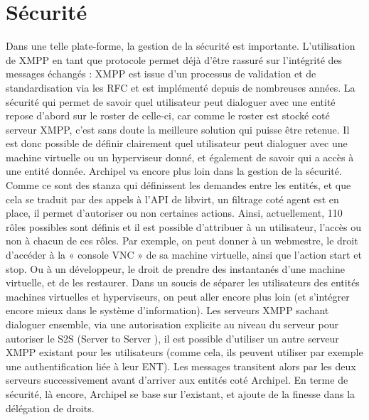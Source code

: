     \section{Sécurité}
Dans une telle plate-forme, la gestion de la sécurité est importante. L'utilisation de XMPP en tant que
protocole permet déjà d'être rassuré sur l'intégrité des messages échangés : XMPP est issue d'un
processus de validation et de standardisation via les RFC et est implémenté depuis de nombreuses
années.\newline
La sécurité qui permet de savoir quel utilisateur peut dialoguer avec une entité repose d'abord sur le
roster de celle-ci, car comme le roster est stocké coté serveur XMPP, c'est sans doute la meilleure solution
qui puisse être retenue. Il est donc possible de définir clairement quel utilisateur peut dialoguer avec une
machine virtuelle ou un hyperviseur donné, et également de savoir qui a accès à une entité donnée.
Archipel va encore plus loin dans la gestion de la sécurité. Comme ce sont des stanza qui définissent les
demandes entre les entités, et que cela se traduit par des appels à l'API de libvirt, un filtrage coté agent
est en place, il permet d'autoriser ou non certaines actions. Ainsi, actuellement, 110 rôles possibles sont
définis et il est possible d'attribuer à un utilisateur, l'accès ou non à chacun de ces rôles. Par exemple, on
peut donner à un webmestre, le droit d’accéder à la « console VNC » de sa machine virtuelle, ainsi que
l'action start et stop. Ou à un développeur, le droit de prendre des instantanés d'une machine virtuelle, et
de les restaurer.\newline
Dans un soucis de séparer les utilisateurs des entités machines virtuelles et hyperviseurs, on peut aller
encore plus loin (et s'intégrer encore mieux dans le système d'information). Les serveurs XMPP sachant
dialoguer ensemble, via une autorisation explicite au niveau du serveur pour autoriser le S2S (Server to
Server ), il est possible d'utiliser un autre serveur XMPP existant pour les utilisateurs (comme cela, ils
peuvent utiliser par exemple une authentification liée à leur ENT). Les messages transitent alors par les
deux serveurs successivement avant d'arriver aux entités coté Archipel.\newline
En terme de sécurité, là encore, Archipel se base sur l'existant, et ajoute de la finesse dans la délégation
de droits.\newline

